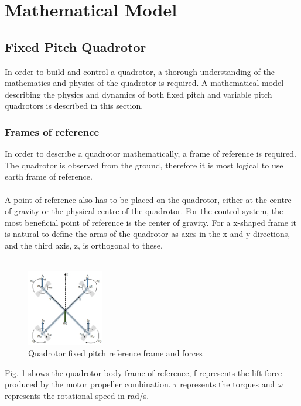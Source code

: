 \section{Mathematical Model}
\subsection{Fixed Pitch Quadrotor}
In order to  build and control a quadrotor, a thorough understanding of the mathematics and physics of the quadrotor is required. A mathematical model describing the physics and dynamics of both fixed pitch and variable pitch quadrotors is described in this section. 
\subsubsection{Frames of reference}
In order to describe a quadrotor mathematically, a frame of reference is required. The quadrotor is observed from the ground, therefore it is most logical to use earth frame of reference.
\\\\
A point of reference also has to be placed on the quadrotor, either at the centre of gravity or the physical centre of the quadrotor. For the control system, the most beneficial point of reference is the center of gravity. For a x-shaped frame it is natural to define the arms of the quadrotor as axes in the x and y directions, and the third axis, z, is orthogonal to these. 
\\\\
\begin{figure}[H]
    \centering
    \includegraphics[width = 0.3\textwidth]{VAPIQ-PICTURES/MMFPQ.jpg}
    \caption{Quadrotor fixed pitch reference frame and forces}
    \label{fig:quadDynamics}
\end{figure}
\noindent
Fig. \ref{fig:quadDynamics} shows the quadrotor body frame of reference, f represents the lift force produced by the motor propeller combination. $\tau$ represents the torques and $\omega$ represents the rotational speed in rad/s.
\\\\
